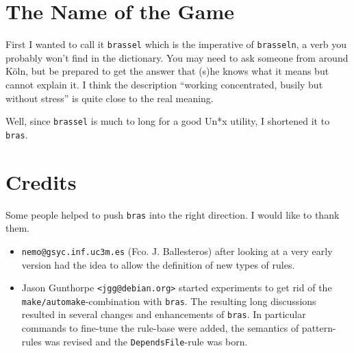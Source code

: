 \documentclass[12pt]{article}
\newcommand{\bras}{\texttt{bras}}
\begin{document}
\section{The Name of the Game}

First I wanted to call it \texttt{brassel} which is the imperative of
\texttt{brasseln}, a verb you probably won't find in the
dictionary. You may need to ask someone from around K\"oln, but be
prepared to get the answer that (s)he knows what it means but cannot
explain it. I think the description "`working concentrated, busily but
without stress"' is quite close to the real meaning.

Well, since \texttt{brassel} is much to long for a good
Un*x utility, I shortened it to \bras.

\section{Credits}

Some people helped to push \bras{} into the right direction. I
would like to thank them. 

\begin{itemize}
\item \texttt{nemo@gsyc.inf.uc3m.es} (Fco. J. Ballesteros) after
looking at a very early version had the
idea to allow the definition of new types of rules.

\item Jason Gunthorpe \texttt{<jgg@debian.org>} started
experiments to get rid of the \texttt{make/automake}-combination with
\bras{}. The resulting long discussions resulted in several changes
and enhancements of \bras{}. In particular commands to fine-tune the
rule-base were added, the semantics of pattern-rules was revised and
the \texttt{DependsFile}-rule was born.
\end{itemize}
\end{document}
